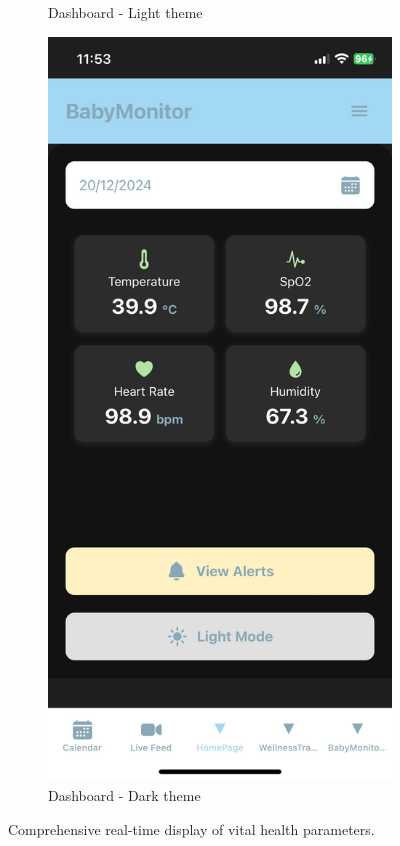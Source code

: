 \documentclass[12pt,a4paper]{report}
\begin{document}
\begin{figure}[H]
\begin{subfigure}[b]{0.22\textwidth}
    \caption{Dashboard - Light theme}
    \label{fig:dashboard-light}
\end{subfigure}
  \hspace{0.1\textwidth}
  \begin{subfigure}[b]{0.22\textwidth} %
      \centering
      \includegraphics[width=\textwidth]{./pic/dark-mode.jpeg}
      \caption{Dashboard - Dark theme}
      \label{fig:dashboard-dark}
  \end{subfigure}
  
  
  \caption{Comprehensive real-time display of vital health parameters.}
    \label{fig:dashboard}
\end{figure}
\end{document}
